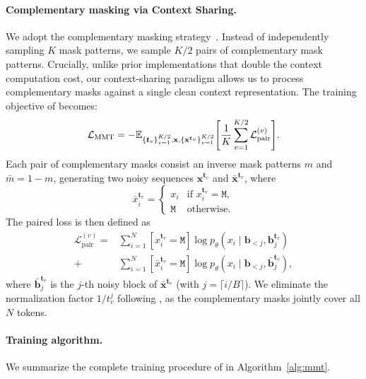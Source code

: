\paragraph{Complementary masking via Context Sharing.}
We adopt the complementary masking strategy~\citep{fastdllmv2}.
Instead of independently sampling $K$ mask patterns, we sample $K/2$ pairs of complementary mask patterns.
Crucially, unlike prior implementations that double the context computation cost, our context-sharing paradigm allows us to process complementary masks against a single clean context representation.
 The training objective of \name{} becomes:
\begin{equation}
    \mathcal{L}_{\text{MMT{}}} = -\mathbb{E}_{\{\boldsymbol{t}_v\}_{v=1}^{K/2}, \mathbf{x}, \{\mathbf{x}^{\boldsymbol{t}_v}\}_{v=1}^{K/2}} \Bigg[
    \frac{1}{K} \sum_{v=1}^{K/2} \mathcal{L}_{\text{pair}}^{(v)}\Bigg].
\end{equation}
Each pair of complementary masks consist an inverse mask patterns $m$ and $\bar m= 1-m$, generating two noisy sequences $\mathbf{x}^{\boldsymbol{t}_v}$ and $\bar{\mathbf{x}}^{\boldsymbol{t}_v}$, where
\begin{equation}
    \bar{x}_i^{\boldsymbol{t}_v} =
    \begin{cases}
        x_i & \text{if } x_i^{\boldsymbol{t}_v} = \mathtt{M}, \\
        \mathtt{M} & \text{otherwise}.
    \end{cases}
\end{equation}
The paired loss is then defined as
\begin{equation}
\begin{aligned}
    \mathcal{L}_{\text{pair}}^{(v)} = & \sum_{i=1}^N [x_i^{\boldsymbol{t}_v} = \mathtt{M}] \log p_{\theta}(x_i \mid \mathbf{b}_{<j}, \mathbf{b}_{j}^{\boldsymbol{t}_v}) \\
    + & \sum_{i=1}^N [\bar{x}_i^{\boldsymbol{t}_v} = \mathtt{M}] \log p_{\theta}(x_i \mid \mathbf{b}_{<j}, \bar{\mathbf{b}}_{j}^{\boldsymbol{t}_v}),
\end{aligned}
\end{equation}
where $\bar{\mathbf{b}}^{\boldsymbol{t}_v}_{j}$ is the $j$-th noisy block of $\bar{\mathbf{x}}^{\boldsymbol{t}_v}$ (with $j=\lceil i/B \rceil$). We eliminate the normalization factor $1/t_v^j$ following \citet{fastdllmv2}, as the complementary masks jointly cover all $N$ tokens.

\paragraph{Training algorithm.}
We summarize the complete training procedure of \name{} in Algorithm~\ref{alg:mmt}.

